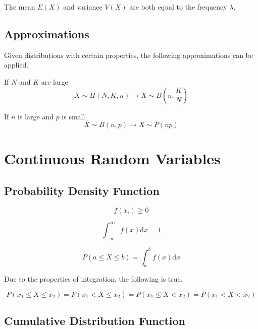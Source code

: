 \documentclass[12pt]{article}
\begin{document}
	\noindent The mean \(E(X)\) and variance \(V(X)\) are both equal to the frequency \(\lambda\).
	
	\subsection{Approximations}
	
	Given distributions with certain properties, the following approximations can be applied.
	
	If \(N\) and \(K\) are large
	\begin{equation*}
		X\sim H(N,K,n)\rightarrow X\sim B\left(n, \frac{K}{N}\right)
	\end{equation*}
	
	If \(n\) is large and \(p\) is small
	\begin{equation*}
		X\sim B(n,p)\rightarrow X\sim P(np)
	\end{equation*}
	
	\newpage
	\section{Continuous Random Variables}
	
	\subsection{Probability Density Function}
	
	\begin{equation*}
	f(x_{i})\geq 0
	\end{equation*}
	
	\begin{equation*}
	\int_{-\infty}^{\infty}f(x)\mathrm{d} x=1
	\end{equation*}
	
	\begin{equation*}
	P(a\leq X\leq b)=\int_{a}^{b}f(x)\mathrm{d} x
	\end{equation*}
	
	\noindent Due to the properties of integration, the following is true.
	
	\begin{equation*}
		P(x_1\leq X\leq x_2)=P(x_1 < X\leq x_2)=P(x_1\leq X < x_2)=P(x_1 < X < x_2)
	\end{equation*}
	
	\subsection{Cumulative Distribution Function}
	
\end{document}
